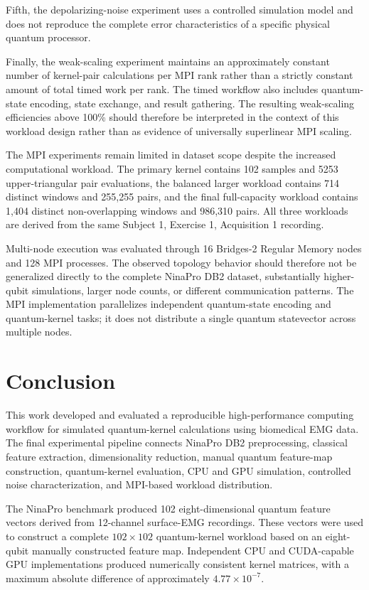 \documentclass[pdflatex,sn-mathphys-num]{sn-jnl}%
\theoremstyle{thmstyleone}%
\theoremstyle{thmstyletwo}%
\theoremstyle{thmstylethree}%
\begin{document}
Fifth, the depolarizing-noise experiment uses a controlled simulation model and
does not reproduce the complete error characteristics of a specific physical
quantum processor.

Finally, the weak-scaling experiment maintains an approximately constant
number of kernel-pair calculations per MPI rank rather than a strictly
constant amount of total timed work per rank. The timed workflow also includes
quantum-state encoding, state exchange, and result gathering. The resulting
weak-scaling efficiencies above 100\% should therefore be interpreted in the
context of this workload design rather than as evidence of universally
superlinear MPI scaling.

The MPI experiments remain limited in dataset scope despite the increased
computational workload. The primary kernel contains 102 samples and 5253
upper-triangular pair evaluations, the balanced larger workload contains
714 distinct windows and 255,255 pairs, and the final full-capacity workload
contains 1,404 distinct non-overlapping windows and 986,310 pairs. All three
workloads are derived from the same Subject 1, Exercise 1, Acquisition 1
recording.

Multi-node execution was evaluated through 16 Bridges-2 Regular Memory nodes
and 128 MPI processes. The observed topology behavior should therefore not be
generalized directly to the complete NinaPro DB2 dataset, substantially
higher-qubit simulations, larger node counts, or different communication
patterns. The MPI implementation parallelizes independent quantum-state
encoding and quantum-kernel tasks; it does not distribute a single quantum
statevector across multiple nodes.


\section{Conclusion}\label{sec:conclusion}

This work developed and evaluated a reproducible high-performance computing
workflow for simulated quantum-kernel calculations using biomedical EMG data.
The final experimental pipeline connects NinaPro DB2 preprocessing, classical
feature extraction, dimensionality reduction, manual quantum feature-map
construction, quantum-kernel evaluation, CPU and GPU simulation, controlled
noise characterization, and MPI-based workload distribution.

The NinaPro benchmark produced 102 eight-dimensional quantum feature vectors
derived from 12-channel surface-EMG recordings. These vectors were used to
construct a complete $102\times102$ quantum-kernel workload based on an
eight-qubit manually constructed feature map. Independent CPU and CUDA-capable
GPU implementations produced numerically consistent kernel matrices, with a
maximum absolute difference of approximately $4.77\times10^{-7}$.
\end{document}
